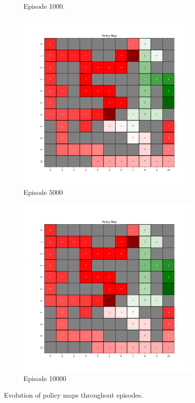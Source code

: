\documentclass{assignment}
\begin{document}
\begin{figure}[H]
\begin{subfigure}{0.3\textwidth}
    \caption{Episode 1000.}
    \end{subfigure}\hfill
    \begin{subfigure}{0.3\textwidth}
        \includegraphics[width=\textwidth]{figures/policy_q/default/policy_alpha_0.1_gamma_0.95_epsilon_0.2_iteration_5000.png}
    \caption{Episode 5000}
    \end{subfigure}\hfill
    \begin{subfigure}{0.3\textwidth}
        \includegraphics[width=\textwidth]{figures/policy_q/default/policy_alpha_0.1_gamma_0.95_epsilon_0.2_iteration_10000.png}
    \caption{Episode 10000}
    \end{subfigure}
    \caption{Evolution of policy maps throughout episodes.}
    \label{fig:default_q_learning_policy}
\end{figure}
\end{document}
